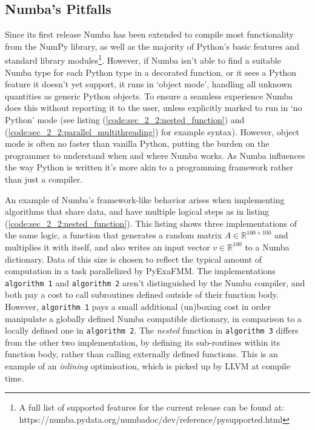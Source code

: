\subsection*{Numba's Pitfalls}


Since its first release Numba has been extended to compile most functionality from the NumPy library, as well as the majority of Python's basic features and standard library modules\footnote{A full list of supported features for the current release can be found at: https://numba.pydata.org/numba\-doc/dev/reference/pysupported.html}. However, if Numba isn't able to find a suitable Numba type for each Python type in a decorated function, or it sees a Python feature it doesn't yet support, it runs in `object mode', handling all unknown quantities as generic Python objects. To ensure a seamless experience Numba does this without reporting it to the user, unless explicitly marked to run in `no Python' mode (see listing (\ref{code:sec_2_2:nested_function}) and (\ref{code:sec_2_2:parallel_multithreading}) for example syntax). However, object mode is often no faster than vanilla Python, putting the burden on the programmer to understand when and where Numba works. As Numba influences the way Python is written it's more akin to a programming framework rather than just a compiler.

An example of Numba's framework-like behavior arises when implementing algorithms that share data, and have multiple logical steps as in listing (\ref{code:sec_2_2:nested_function}). This listing shows three implementations of the same logic, a function that generates a random matrix $A \in \mathbb{R}^{100 \times 100}$ and multiplies it with itself, and also writes an input vector $v \in \mathbb{R}^{100}$ to a Numba dictionary. Data of this size is chosen to reflect the typical amount of computation in a task parallelized by PyExaFMM. The implementations \lstinline{algorithm 1} and \lstinline{algorithm 2} aren't distinguished by the Numba compiler, and both pay a cost to call subroutines defined outside of their function body. However, \lstinline{algorithm 1} pays a small additional (un)boxing cost in order manipulate a globally defined Numba compatible dictionary, in comparison to a locally defined one in \lstinline{algorithm 2}. The \textit{nested} function in \lstinline{algorithm 3} differs from the other two implementation, by defining its sub-routines within its function body, rather than calling externally defined functions. This is an example of an \textit{inlining} optimisation, which is picked up by LLVM at compile time.

